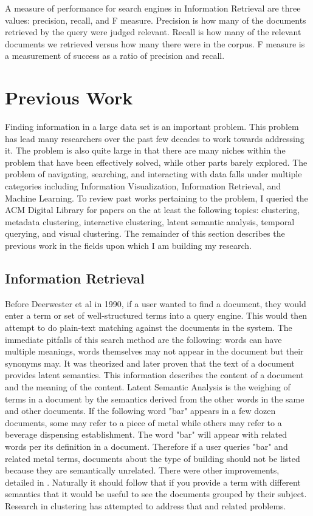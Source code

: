 \documentclass[11pt]{article}
\begin{document}
A measure of performance for search engines in Information Retrieval are three values: precision, recall, and F measure.
Precision is how many of the documents retrieved by the query were judged relevant.
Recall is how many of the relevant documents we retrieved versus how many there were in the corpus.
F measure is a measurement of success as a ratio of precision and recall.

\section{Previous Work}

Finding information in a large data set is an important problem.
This problem has lead many researchers over the past few decades to work towards addressing it.
The problem is also quite large in that there are many niches within the problem that have been effectively solved, while other parts barely explored.
The problem of navigating, searching, and interacting with data falls under multiple categories including Information Visualization, Information Retrieval, and Machine Learning.
To review past works pertaining to the problem, I queried the ACM Digital Library for papers on the at least the following topics: clustering, metadata clustering, interactive clustering, latent semantic analysis, temporal querying, and visual clustering.
The remainder of this section describes the previous work in the fields upon which I am building my research.

\subsection{Information Retrieval}

Before Deerwester et al in 1990, if a user wanted to find a document, they would enter a term or set of well-structured terms into a query engine.  This would then attempt to do plain-text matching against the documents in the system.
The immediate pitfalls of this search method are the following: words can have multiple meanings, words themselves may not appear in the document but their synonyms may.
It was theorized and later proven that the text of a document provides latent semantics.
This information describes the content of a document and the meaning of the content.
Latent Semantic Analysis is the weighing of terms in a document by the semantics derived from the other words in the same and other documents.
If the following word "bar" appears in a few dozen documents, some may refer to a piece of metal while others may refer to a beverage dispensing establishment.
The word "bar" will appear with related words per its definition in a document.
Therefore if a user queries "bar" and related metal terms, documents about the type of building should not be listed because they are semantically unrelated.
There were other improvements, detailed in \cite{Deerwester90}.
Naturally it should follow that if you provide a term with different semantics that it would be useful to see the documents grouped by their subject.
Research in clustering has attempted to address that and related problems.
\end{document}

